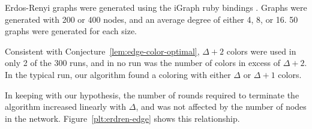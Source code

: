 Erdos-Renyi graphs were generated using the iGraph ruby bindings \cite{Gutteridge:2007fk}. Graphs were generated with 200 or 400 nodes, and an average degree of either 4, 8, or 16. 50 graphs were generated for each size.

Consistent with Conjecture~\ref{lem:edge-color-optimal}, $\Delta + 2$ colors were used in only 2 of the 300 runs, and in no run was the number of colors in excess of $\Delta+2$. In the typical run, our algorithm found a coloring with either $\Delta$ or $\Delta + 1$ colors. 

In keeping with our hypothesis, the number of rounds required to terminate the algorithm increased linearly with $\Delta$, and was not affected by the number of nodes in the network. Figure~\ref{plt:erdren-edge} shows this relationship.


